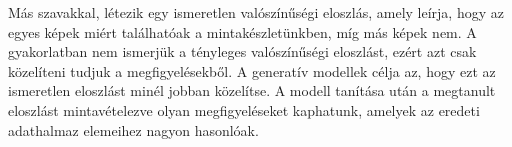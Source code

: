 Más szavakkal, létezik egy ismeretlen valószínűségi eloszlás, amely leírja, hogy az egyes képek miért találhatóak a mintakészletünkben, míg más képek nem. A gyakorlatban nem ismerjük a tényleges valószínűségi eloszlást, ezért azt csak közelíteni tudjuk a megfigyelésekből. A generatív modellek célja az, hogy ezt az ismeretlen eloszlást minél jobban közelítse. A modell tanítása után a  megtanult eloszlást mintavételezve olyan megfigyeléseket kaphatunk, amelyek az eredeti adathalmaz elemeihez nagyon hasonlóak.




